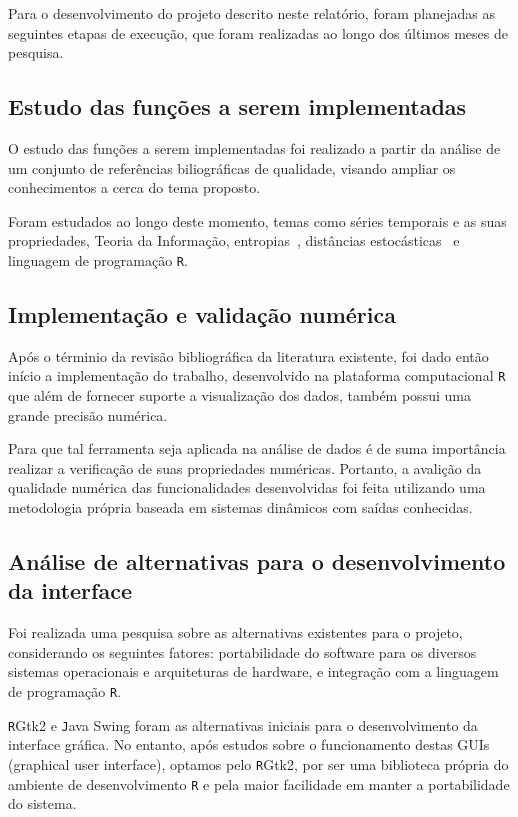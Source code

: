\documentclass[12pt,letterpaper]{article}
\begin{document}
Para o desenvolvimento do projeto descrito neste relatório, foram planejadas as seguintes etapas de execução, que foram realizadas ao longo dos últimos meses de pesquisa.

\subsection*{Estudo das funções a serem implementadas}

O estudo das funções a serem implementadas foi realizado a partir da análise de um conjunto de referências biliográficas de qualidade, visando ampliar os conhecimentos a cerca do tema proposto.

Foram estudados ao longo deste momento, temas como séries temporais e as suas propriedades, Teoria da Informação, entropias~\cite{salicruetal1993}, distâncias estocásticas~\cite{StatisticalInferenceBasedonDivergenceMeasures} e linguagem de programação \texttt R.

\subsection*{Implementação e validação numérica}

Após o términio da revisão bibliográfica da literatura existente, foi dado então início a implementação do trabalho, desenvolvido na plataforma computacional \texttt R que além de fornecer suporte a visualização dos dados, também possui uma grande precisão numérica.

Para que tal ferramenta seja aplicada na análise de dados é de suma importância realizar a verificação de suas propriedades numéricas. Portanto, a avalição da qualidade numérica das funcionalidades desenvolvidas foi feita utilizando uma metodologia própria baseada em sistemas dinâmicos com saídas conhecidas.

\subsection*{Análise de alternativas para o desenvolvimento da interface}

Foi realizada uma pesquisa sobre as alternativas existentes para o projeto, considerando os seguintes fatores: portabilidade do software para os diversos sistemas operacionais e arquiteturas de hardware, e integração com a linguagem de programação \texttt R.

\texttt RGtk2 e \texttt Java Swing foram as alternativas iniciais para o desenvolvimento da interface gráfica. No entanto, após estudos sobre o funcionamento destas GUIs (graphical user interface), optamos pelo \texttt RGtk2, por ser uma biblioteca própria do ambiente de desenvolvimento \texttt R e pela maior facilidade em manter a portabilidade do sistema.
\end{document}
